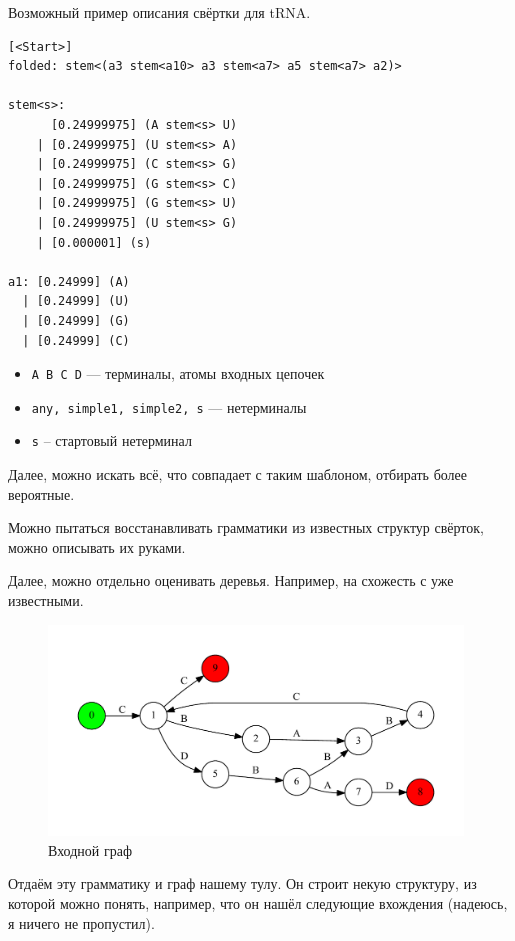 \documentclass[a5paper]{article}
\begin{document}
Возможный пример описания свёртки для tRNA.

\begin{verbatim}
[<Start>]
folded: stem<(a3 stem<a10> a3 stem<a7> a5 stem<a7> a2)>

stem<s>: 
      [0.24999975] (A stem<s> U)
    | [0.24999975] (U stem<s> A)
    | [0.24999975] (C stem<s> G)
    | [0.24999975] (G stem<s> C)
    | [0.24999975] (G stem<s> U)
    | [0.24999975] (U stem<s> G)
    | [0.000001] (s)

a1: [0.24999] (A)
  | [0.24999] (U)
  | [0.24999] (G)
  | [0.24999] (C)
\end{verbatim}

\begin{itemize}
\item \texttt{A B C D} --- терминалы, атомы входных цепочек
\item \texttt{any, simple1, simple2, s} --- нетерминалы
\item \texttt{s} -- стартовый нетерминал
\end{itemize}

Далее, можно искать всё, что совпадает с таким шаблоном, отбирать более вероятные.


Можно пытаться восстанавливать грамматики из известных структур свёрток, можно описывать их руками.

Далее, можно отдельно оценивать деревья. Например, на схожесть с уже известными.
\begin{figure}[H]
    \begin{center}
        \includegraphics[width=11cm]{input.pdf}
        \caption{Входной граф}
        \label{pic1}        
    \end{center}
\end{figure}

Отдаём эту грамматику и граф нашему тулу. Он строит некую структуру, из которой можно понять, например, что он нашёл следующие вхождения (надеюсь, я ничего не пропустил).
\end{document}
